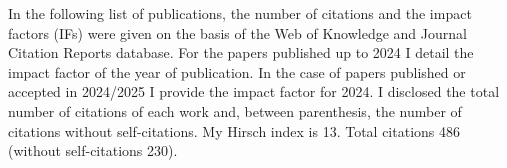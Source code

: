 \documentclass[12pt,reqno]{amsbook}
\begin{document}
\noindent
In the following list of publications, the number of citations and the impact factors (IFs) were given on the basis of  the Web of Knowledge and Journal Citation Reports database. For the papers published up to 2024 I detail the impact factor of the year of publication. In the case of papers published or accepted in 2024/2025 I provide the impact factor for 2024.  I disclosed the total number of citations of each work and, between parenthesis, the number of citations without self-citations.   My Hirsch index is 13. Total citations 486 (without self-citations 230). 
\begin{enumerate}


 









\end{enumerate}
\end{document}
